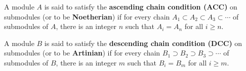 A module \(A\) is said to satisfy the \textbf{ascending chain condition (ACC)} on submodules (or to be \textbf{Noetherian}) if for every chain \(A_1 \subset A_2 \subset A_3 \subset \cdots\) of submodules of \(A\), there is an integer \(n\) such that \(A_i = A_n\) for all \(i \geq n\).

A module \(B\) is said to satisfy the \textbf{descending chain condition (DCC)} on submodules (or to be \textbf{Artinian}) if for every chain \(B_1 \supset B_2 \supset B_3 \supset \cdots\) of submodules of \(B\), there is an integer \(m\) such that \(B_i = B_m\) for all \(i \geq m\).
